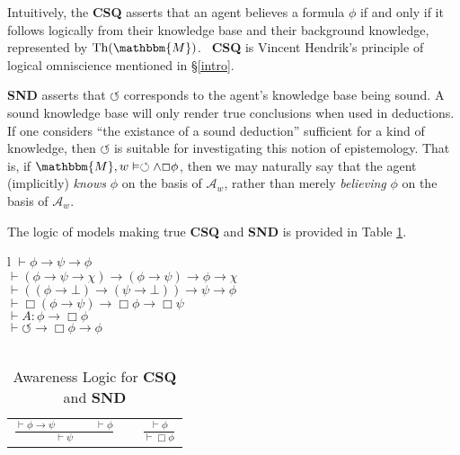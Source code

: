 \documentclass{article}
\newcommand{\tmem}[1]{{\em #1\/}}
\newcommand{\tmop}[1]{\ensuremath{\operatorname{#1}}}
\newcommand{\tmtextbf}[1]{{\bfseries{#1}}}
\begin{document}
Intuitively, the \tmtextbf{CSQ} asserts that an agent believes a formula
$\phi$ if and only if it follows logically from their knowledge base and their
background knowledge, represented by $\tmop{Th} (\mathbbm{M})$. \
\tmtextbf{CSQ} is Vincent Hendrik's principle of logical omniscience mentioned
in {\S}\ref{intro}.



\tmtextbf{SND} asserts that $\circlearrowleft$ corresponds to the agent's
knowledge base being sound. A sound knowledge base will only render true
conclusions when used in deductions.  If one considers ``the existance of a
sound deduction'' sufficient for a kind of knowledge, then $\circlearrowleft$
is suitable for investigating this notion of epistemology.  That is, if
$\mathbbm{M}, w \vDash \circlearrowleft \wedge \Box \phi$, then we may
naturally say that the agent (implicitly) {\tmem{knows}} $\phi$ on the basis
of $\mathcal{A}_w$, rather than merely {\tmem{believing}} $\phi$ on the basis
of $\mathcal{A}_w$.



The logic of models making true \tmtextbf{CSQ} and \tmtextbf{SND} is provided
in Table \ref{logic1}.

\begin{table}[h]
  \begin{tabular}{l}
    $\vdash \phi \rightarrow \psi \rightarrow \phi$\\
    $\vdash (\phi \rightarrow \psi \rightarrow \chi) \rightarrow (\phi
    \rightarrow \psi) \rightarrow \phi \rightarrow \chi$\\
    $\vdash ((\phi \rightarrow \bot) \rightarrow (\psi \rightarrow \bot))
    \rightarrow \psi \rightarrow \phi$\\
    $\vdash \Box(\phi \rightarrow \psi) \rightarrow \Box \phi \rightarrow \Box
    \psi$\\
    $\vdash A : \phi \rightarrow \Box \phi$\\
    $\vdash \circlearrowleft \rightarrow \Box \phi \rightarrow \phi$\\
    \\
    \begin{tabular}{lll}
      $\frac{\vdash \phi \rightarrow \psi \hspace{4em} \vdash \phi}{\vdash
      \psi}$ & {\hspace{6em}} & $\frac{\vdash \phi}{\vdash \Box \phi}$
    \end{tabular}
  \end{tabular}
  \caption{\label{logic1}Awareness Logic for \tmtextbf{CSQ} and
  \tmtextbf{SND}}
\end{table}
\end{document}

